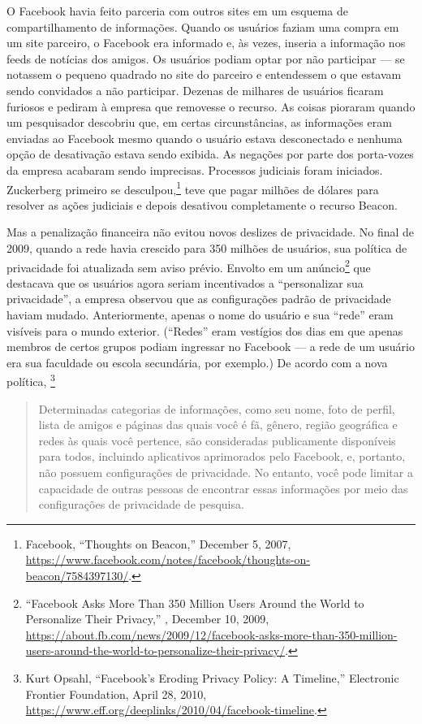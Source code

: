 O Facebook havia feito parceria com outros sites em um esquema de compartilhamento de informações.
Quando os usuários faziam uma compra em um site parceiro, o Facebook era informado e, às vezes,
inseria a informação nos feeds de notícias dos amigos. Os usuários podiam optar por não participar
--- se notassem o pequeno quadrado no site do parceiro e entendessem o que estavam sendo convidados
a não participar. Dezenas de milhares de usuários ficaram furiosos e pediram à empresa que
removesse o recurso. As coisas pioraram quando um pesquisador descobriu que, em certas
circunstâncias, as informações eram enviadas ao Facebook mesmo quando o usuário estava desconectado
e nenhuma opção de desativação estava sendo exibida. As negações por parte dos porta-vozes da
empresa acabaram sendo imprecisas. Processos judiciais foram iniciados. Zuckerberg primeiro se
desculpou,\footnote{Facebook, ``Thoughts on Beacon,'' December 5, 2007,
\url{https://www.facebook.com/notes/facebook/thoughts-on-beacon/7584397130/}.} teve que pagar
milhões de dólares para resolver as ações judiciais e depois desativou completamente o recurso
Beacon.

Mas a penalização financeira não evitou novos deslizes de privacidade. No final de 2009, quando a
rede havia crescido para 350 milhões de usuários, sua política de privacidade foi atualizada sem
aviso prévio. Envolto em um anúncio\footnote{``Facebook Asks More Than 350 Million Users Around the
World to Personalize Their Privacy,'' , December 10, 2009,
\url{https://about.fb.com/news/2009/12/facebook-asks-more-than-350-million-users-around-the-world-to-personalize-their-privacy/}.}
que destacava que os usuários agora seriam incentivados a ``personalizar sua privacidade'', a
empresa observou que as configurações padrão de privacidade haviam mudado. Anteriormente, apenas
o nome do usuário e sua ``rede'' eram visíveis para o mundo exterior. (``Redes'' eram vestígios
dos dias em que apenas membros de certos grupos podiam ingressar no Facebook --- a rede de um
usuário era sua faculdade ou escola secundária, por exemplo.) De acordo com a nova política,
\footnote{Kurt Opsahl, ``Facebook’s Eroding Privacy Policy: A Timeline,'' Electronic Frontier
Foundation, April 28, 2010, \url{https://www.eff.org/deeplinks/2010/04/facebook-timeline}.}

\begin{quote}
    Determinadas categorias de informações, como seu nome, foto de perfil, lista de amigos e
    páginas das quais você é fã, gênero, região geográfica e redes às quais você pertence, são
    consideradas publicamente disponíveis para todos, incluindo aplicativos aprimorados pelo
    Facebook, e, portanto, não possuem configurações de privacidade. No entanto, você pode limitar
    a capacidade de outras pessoas de encontrar essas informações por meio das configurações de
    privacidade de pesquisa.
\end{quote}

